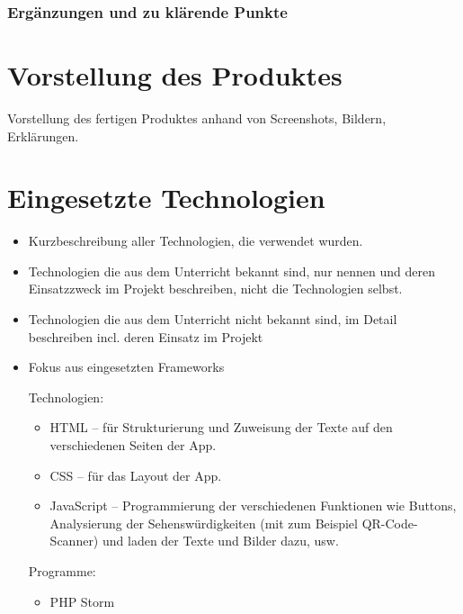 \subsection{Ergänzungen und zu klärende Punkte}

\chapter{Vorstellung des Produktes}
Vorstellung des fertigen Produktes anhand von Screenshots, Bildern, Erklärungen.

\chapter{Eingesetzte Technologien}
\begin{itemize}
	\item Kurzbeschreibung aller Technologien, die verwendet wurden.
	\item Technologien die aus dem Unterricht bekannt sind, nur nennen und deren  Einsatzzweck im Projekt beschreiben, nicht die Technologien selbst.
	\item Technologien die aus dem Unterricht nicht bekannt sind, im Detail beschreiben incl. deren Einsatz im Projekt
	\item Fokus aus eingesetzten Frameworks
	
	
	Technologien:
	\begin{itemize}
	\item HTML – für Strukturierung und Zuweisung der Texte auf den verschiedenen Seiten der App.
	\item CSS – für das Layout der App.
	\item JavaScript – Programmierung der verschiedenen Funktionen wie Buttons, Analysierung der Sehenswürdigkeiten (mit zum Beispiel QR-Code-Scanner) und laden der Texte und Bilder dazu, usw.\\
	\end{itemize}

	Programme:
	\begin{itemize}
	\item PHP Storm\\\\\\
	\end{itemize}
	

\end{itemize}

